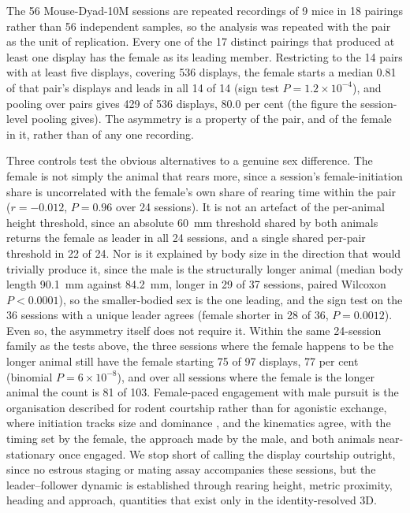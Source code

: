 \documentclass[11pt]{article}
\begin{document}
The 56 Mouse-Dyad-10M sessions are repeated recordings of 9 mice in 18 pairings rather than 56 independent samples, so the analysis was repeated with the pair as the unit of replication. Every one of the 17 distinct pairings that produced at least one display has the female as its leading member. Restricting to the 14 pairs with at least five displays, covering 536 displays, the female starts a median 0.81 of that pair's displays and leads in all 14 of 14 (sign test $P = 1.2 \times 10^{-4}$), and pooling over pairs gives 429 of 536 displays, 80.0 per cent (the figure the session-level pooling gives). The asymmetry is a property of the pair, and of the female in it, rather than of any one recording.

Three controls test the obvious alternatives to a genuine sex difference. The female is not simply the animal that rears more, since a session's female-initiation share is uncorrelated with the female's own share of rearing time within the pair ($r = -0.012$, $P = 0.96$ over 24 sessions). It is not an artefact of the per-animal height threshold, since an absolute 60~mm threshold shared by both animals returns the female as leader in all 24 sessions, and a single shared per-pair threshold in 22 of 24. Nor is it explained by body size in the direction that would trivially produce it, since the male is the structurally longer animal (median body length 90.1~mm against 84.2~mm, longer in 29 of 37 sessions, paired Wilcoxon $P < 0.0001$), so the smaller-bodied sex is the one leading, and the sign test on the 36 sessions with a unique leader agrees (female shorter in 28 of 36, $P = 0.0012$). Even so, the asymmetry itself does not require it. Within the same 24-session family as the tests above, the three sessions where the female happens to be the longer animal still have the female starting 75 of 97 displays, 77 per cent (binomial $P = 6 \times 10^{-8}$), and over all sessions where the female is the longer animal the count is 81 of 103. Female-paced engagement with male pursuit is the organisation described for rodent courtship rather than for agonistic exchange, where initiation tracks size and dominance \citep{Beach1976,McClintock1978,Erskine1989}, and the kinematics agree, with the timing set by the female, the approach made by the male, and both animals near-stationary once engaged. We stop short of calling the display courtship outright, since no estrous staging or mating assay accompanies these sessions, but the leader--follower dynamic is established through rearing height, metric proximity, heading and approach, quantities that exist only in the identity-resolved 3D.
\end{document}
